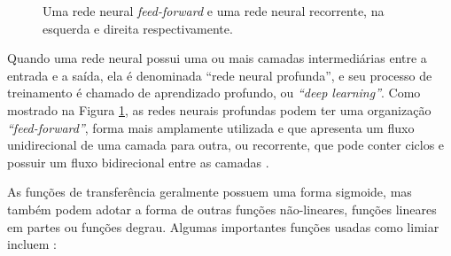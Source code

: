 \documentclass[
	12pt,				%
	openright,			%
	twoside,			%
	a4paper,			%
	tcc,			%
	]{ABNT-DC-UEL}
\begin{document}
\begin{figure}[hbt]
\begin{subfigure}{.49\textwidth}
{}
    \end{subfigure}    
    \caption{Uma rede neural \textit{feed-forward} e uma rede neural recorrente, na esquerda e direita respectivamente.}
    \label{fig:ann}
\end{figure}

Quando uma rede neural possui uma ou mais camadas intermediárias entre a entrada e a saída, ela é denominada ``rede neural profunda'', e seu processo de treinamento é chamado de aprendizado profundo, ou \textit{``deep learning''}. Como mostrado na Figura \ref{fig:ann}, as redes neurais profundas podem ter uma organização \textit{``feed-forward''}, forma mais amplamente utilizada e que apresenta um fluxo unidirecional de uma camada para outra, ou recorrente, que pode conter ciclos e possuir um fluxo bidirecional entre as camadas \cite{mathew:21}.

As funções de transferência geralmente possuem uma forma sigmoide, mas também podem adotar a forma de outras funções não-lineares, funções lineares em partes ou funções degrau. Algumas importantes funções usadas como limiar incluem \cite{sharma:20}:
\end{document}
